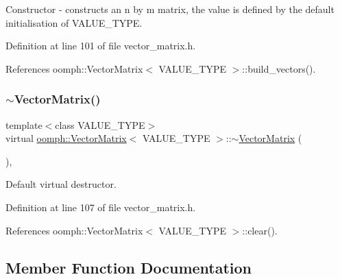 Constructor -\/ constructs an n by m matrix, the value is defined by the default initialisation of V\+A\+L\+U\+E\+\_\+\+T\+Y\+PE. 



Definition at line 101 of file vector\+\_\+matrix.\+h.



References oomph\+::\+Vector\+Matrix$<$ V\+A\+L\+U\+E\+\_\+\+T\+Y\+P\+E $>$\+::build\+\_\+vectors().

\mbox{\label{classoomph_1_1VectorMatrix_a61ef8bc51fd59119d84ce281d6dd82be}} 
\subsubsection{\texorpdfstring{$\sim$\+Vector\+Matrix()}{~VectorMatrix()}}
{\footnotesize\ttfamily template$<$class V\+A\+L\+U\+E\+\_\+\+T\+Y\+PE$>$ \\
virtual \hyperlink{classoomph_1_1VectorMatrix}{oomph\+::\+Vector\+Matrix}$<$ V\+A\+L\+U\+E\+\_\+\+T\+Y\+PE $>$\+::$\sim$\hyperlink{classoomph_1_1VectorMatrix}{Vector\+Matrix} (\begin{DoxyParamCaption}{ }\end{DoxyParamCaption})\hspace{0.3cm}{\ttfamily [inline]}, {\ttfamily [virtual]}}



Default virtual destructor. 



Definition at line 107 of file vector\+\_\+matrix.\+h.



References oomph\+::\+Vector\+Matrix$<$ V\+A\+L\+U\+E\+\_\+\+T\+Y\+P\+E $>$\+::clear().



\subsection{Member Function Documentation}
\mbox{\label{classoomph_1_1VectorMatrix_a4accbf71003ea0fe306689e6e68317cb}} 
